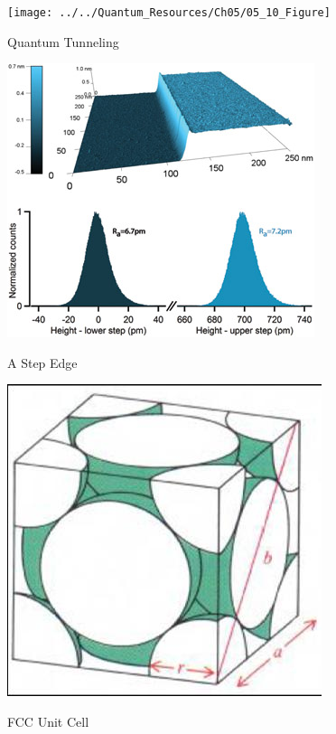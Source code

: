 \documentclass[10pt, letterpaper]{memoir}
\begin{document}
	\hspace{1.5em}
	\begin{minipage}[c]{0.4\textwidth}
		\begin{mdframed}
		\centering\texttt{[image: ../../Quantum\_Resources/Ch05/05\_10\_Figure]}
		
		Quantum Tunneling
		\end{mdframed}
				
		\begin{mdframed}
		\centering\includegraphics[width=\textwidth]{Step}
		
		A Step Edge
		\end{mdframed}
				
		\begin{mdframed}
		\centering\includegraphics[width=\textwidth, trim={.1cm 0.1cm 0.1cm 0.1cm},clip]{FCC}
		
		FCC Unit Cell
		\end{mdframed}
	\end{minipage}
\end{document}
